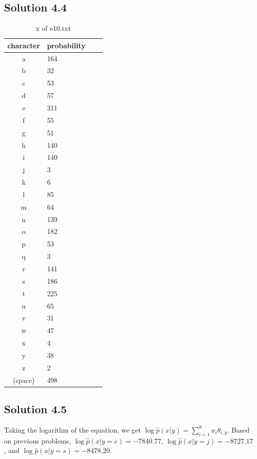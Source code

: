 \documentclass[a4paper]{article}
\theoremstyle{definition}
\newenvironment{soln}{
	\leavevmode\color{blue}\ignorespaces
}{}
\begin{document}
	\subsection*{Solution 4.4}	
	\begin{soln}
	\begin{table}[ht]
 \caption{x of e10.txt}
 \centering
  \begin{tabular}{clll}
   \hline
   character & probability \\
   \hline \hline
a & 164 \\
b & 32 \\
c & 53 \\
d & 57 \\
e & 311 \\
f & 55 \\
g & 51 \\
h & 140 \\
i & 140 \\
j & 3 \\
k & 6 \\
l & 85 \\
m & 64 \\
n & 139 \\
o & 182 \\
p & 53 \\
q & 3 \\
r & 141 \\
s & 186 \\
t & 225 \\
u & 65 \\
v & 31 \\
w & 47 \\
x & 4 \\
y & 38 \\
z & 2 \\
(space)  & 498 \\
   \hline
  \end{tabular}
\end{table}
	\end{soln}

	\clearpage
	\subsection*{Solution 4.5}	
	\begin{soln}
	Taking the logarithm of the equation, we get $\log \hat{p}(x|y) = \sum_{i=1}^{d} x_i \theta_{i,y} $. Based on previous problems, $\log \hat{p}(x|y=e) = -7840.77$, $\log \hat{p}(x|y=j) = -8727.17$, and $\log \hat{p}(x|y=s) = -8478.20. $
	\end{soln}
	
\end{document}
